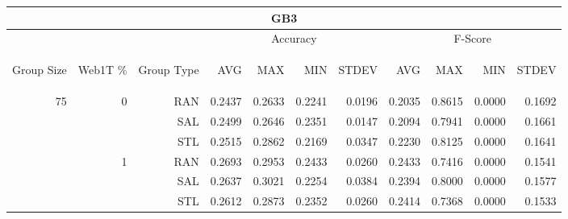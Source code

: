 \begin{center}
\begin{table}[htbp] 
 \begin{center}
\begin{tabular}{ | r | r | r | r | r | r | r | r | r | r | r |}
\hline
\multicolumn{11}{|c|}{GB3}\\
\hline
 & & & \multicolumn{4}{|c|}{Accuracy} & \multicolumn{4}{|c|}{F-Score}\\ \cline{4-11}
\begin{sideways}Group Size\end{sideways} & \begin{sideways}Web1T \%\end{sideways} & \begin{sideways}Group Type\end{sideways} & \begin{sideways}AVG\end{sideways} & \begin{sideways}MAX\end{sideways} & \begin{sideways}MIN\end{sideways} & \begin{sideways}STDEV\end{sideways} & \begin{sideways}AVG\end{sideways} & \begin{sideways}MAX\end{sideways} & \begin{sideways}MIN\end{sideways} & \begin{sideways}STDEV\end{sideways}\\
\hline
\multirow{18}{*}{75}
 & \multirow{3}{*}{0} & RAN & 0.2437 & 0.2633 & 0.2241 & 0.0196 & 0.2035 & 0.8615 & 0.0000 & 0.1692\\ \cline{3-11}
 &   & SAL & 0.2499 & 0.2646 & 0.2351 & 0.0147 & 0.2094 & 0.7941 & 0.0000 & 0.1661\\ \cline{3-11}
 &   & STL & 0.2515 & 0.2862 & 0.2169 & 0.0347 & 0.2230 & 0.8125 & 0.0000 & 0.1641\\ \cline{2-11}
 & \multirow{3}{*}{1} & RAN & 0.2693 & 0.2953 & 0.2433 & 0.0260 & 0.2433 & 0.7416 & 0.0000 & 0.1541\\ \cline{3-11}
 &   & SAL & 0.2637 & 0.3021 & 0.2254 & 0.0384 & 0.2394 & 0.8000 & 0.0000 & 0.1577\\ \cline{3-11}
 &   & STL & 0.2612 & 0.2873 & 0.2352 & 0.0260 & 0.2414 & 0.7368 & 0.0000 & 0.1533\\ \cline{2-11}

\end{tabular}
\end{center}
\end{table}
\end{center}
